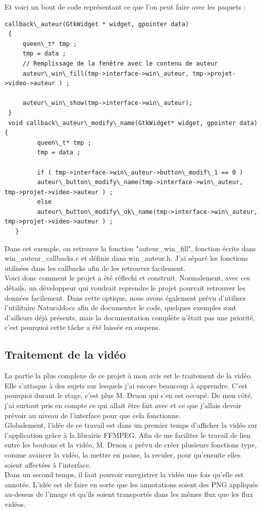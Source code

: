 \documentclass[11pt,french,a4paper]{report}
\begin{document}
Et voici un bout de code représentant ce que l'on peut faire avec les paquets : 
\begin{lstlisting}
callback\_auteur(GtkWidget * widget, gpointer data)
 {
     queen\_t* tmp ;
     tmp = data ;
     // Remplissage de la fenêtre avec le contenu de auteur
     auteur\_win\_fill(tmp->interface->win\_auteur, tmp->projet->video->auteur ) ;

     auteur\_win\_show(tmp->interface->win\_auteur);
 }
 void callback\_auteur\_modify\_name(GtkWidget* widget, gpointer data) {
         queen\_t* tmp ;
         tmp = data ;

         if ( tmp->interface->win\_auteur->button\_modif\_1 == 0 )
         auteur\_button\_modify\_name(tmp->interface->win\_auteur, tmp->projet->video->auteur ) ;
         else
         auteur\_button\_modify\_ok\_name(tmp->interface->win\_auteur, tmp->projet->video->auteur ) ;
   }
\end{lstlisting}
Dans cet exemple, on retrouve la fonction "auteur\_win\_fill", fonction écrite dans win\_auteur\_callbacks.c et définie
dans win\_auteur.h. J'ai séparé les fonctions utilisées dans les callbacks afin de les retrouver facilement. \\
Voici donc comment le projet a été réflechi et construit. Normalement, avec ces détails, un développeur qui voudrait reprendre
le projet pourrait retrouver les données facilement. Dans cette optique, nous avons également prévu d'utiliser
l'utilitaire Naturaldocs afin de documenter le code, quelques exemples sont d'ailleurs déjà présents, mais la documentation 
complète n'était pas une priorité, c'est pourquoi cette tâche a été laissée en suspens. 
       
        \subsection{Traitement de la vidéo}
La partie la plus complexe de ce projet à mon avis est le traitement de la vidéo. Elle s'attaque à des sujets sur lesquels j'ai 
encore beaucoup à apprendre. C'est pourquoi durant le stage, c'est plus M. Druon qui s'en est occupé. De mon côté, j'ai surtout
pris en compte ce qui allait être fait avec et ce que j'allais devoir prévoir au niveau de l'interface pour que cela fonctionne. \\
Globalement, l'idée de ce travail est dans un premier temps d'afficher la vidéo sur l'application grâce à 
la librairie FFMPEG. Afin de me faciliter
le travail de lien entre les boutons et la vidéo, M. Druon a prévu de créer plusieurs fonctions type, comme avancer la vidéo, la 
mettre en pause, la reculer, pour qu'ensuite elles soient affectées à l'interface. \\
Dans un second temps, il faut pouvoir enregistrer la vidéo une fois qu'elle est annotée. L'idée est de faire en sorte que les annotations
soient des PNG appliqués au-dessus de l'image et qu'ils soient transportés dans les mêmes flux que les flux vidéos. \\
\end{document}
